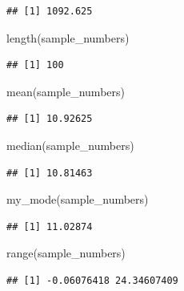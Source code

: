 \documentclass[
]{book}
\newenvironment{Shaded}{\begin{snugshade}}{\end{snugshade}}
\newcommand{\FunctionTok}[1]{\textcolor[rgb]{0.00,0.00,0.00}{#1}}
\newcommand{\NormalTok}[1]{#1}
\begin{document}
\begin{verbatim}
## [1] 1092.625
\end{verbatim}

\begin{Shaded}
\begin{Highlighting}[]
\FunctionTok{length}\NormalTok{(sample\_numbers)}
\end{Highlighting}
\end{Shaded}

\begin{verbatim}
## [1] 100
\end{verbatim}

\begin{Shaded}
\begin{Highlighting}[]
\FunctionTok{mean}\NormalTok{(sample\_numbers)}
\end{Highlighting}
\end{Shaded}

\begin{verbatim}
## [1] 10.92625
\end{verbatim}

\begin{Shaded}
\begin{Highlighting}[]
\FunctionTok{median}\NormalTok{(sample\_numbers)}
\end{Highlighting}
\end{Shaded}

\begin{verbatim}
## [1] 10.81463
\end{verbatim}

\begin{Shaded}
\begin{Highlighting}[]
\FunctionTok{my\_mode}\NormalTok{(sample\_numbers)}
\end{Highlighting}
\end{Shaded}

\begin{verbatim}
## [1] 11.02874
\end{verbatim}

\begin{Shaded}
\begin{Highlighting}[]
\FunctionTok{range}\NormalTok{(sample\_numbers)}
\end{Highlighting}
\end{Shaded}

\begin{verbatim}
## [1] -0.06076418 24.34607409
\end{verbatim}
\end{document}

